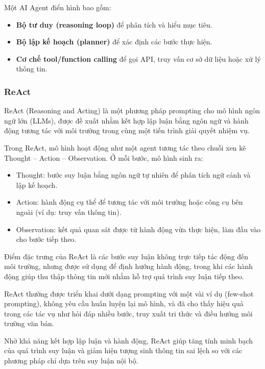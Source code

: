 Một AI Agent điển hình bao gồm:
\begin{itemize}
    \item \textbf{Bộ tư duy (reasoning loop)} để phân tích và hiểu mục tiêu\cite{c4-agent}.
    \item \textbf{Bộ lập kế hoạch (planner)} để xác định các bước thực hiện\cite{c4-agent}.
    \item \textbf{Cơ chế tool/function calling} để gọi API, truy vấn cơ sở dữ liệu hoặc xử lý thông tin\cite{c4-agent}.
\end{itemize}



\subsubsection{ReAct}
ReAct (Reasoning and Acting) là một phương pháp prompting cho mô hình ngôn ngữ lớn (LLMs), được đề xuất nhằm kết hợp lập luận bằng ngôn ngữ và hành động tương tác với môi trường trong cùng một tiến trình giải quyết nhiệm vụ\cite{yao2023reactsynergizingreasoningacting}.

Trong ReAct, mô hình hoạt động như một agent tương tác theo chuỗi xen kẽ Thought – Action – Observation. Ở mỗi bước, mô hình sinh ra:
\begin{itemize}
    \item Thought: bước suy luận bằng ngôn ngữ tự nhiên để phân tích ngữ cảnh và lập kế hoạch\cite{yao2023reactsynergizingreasoningacting}.
    \item Action: hành động cụ thể để tương tác với môi trường hoặc công cụ bên ngoài (ví dụ: truy vấn thông tin)\cite{yao2023reactsynergizingreasoningacting}.
    \item Observation: kết quả quan sát được từ hành động vừa thực hiện, làm đầu vào cho bước tiếp theo\cite{yao2023reactsynergizingreasoningacting}.
\end{itemize}
Điểm đặc trưng của ReAct là các bước suy luận không trực tiếp tác động đến môi trường, nhưng được sử dụng để định hướng hành động, trong khi các hành động giúp thu thập thông tin mới nhằm hỗ trợ quá trình suy luận tiếp theo\cite{yao2023reactsynergizingreasoningacting}.

ReAct thường được triển khai dưới dạng prompting với một vài ví dụ (few-shot prompting), không yêu cầu huấn luyện lại mô hình, và đã cho thấy hiệu quả trong các tác vụ như hỏi đáp nhiều bước, truy xuất tri thức và điều hướng môi trường văn bản\cite{yao2023reactsynergizingreasoningacting}.

Nhờ khả năng kết hợp lập luận và hành động, ReAct giúp tăng tính minh bạch của quá trình suy luận và giảm hiện tượng sinh thông tin sai lệch so với các phương pháp chỉ dựa trên suy luận nội bộ\cite{yao2023reactsynergizingreasoningacting}.



